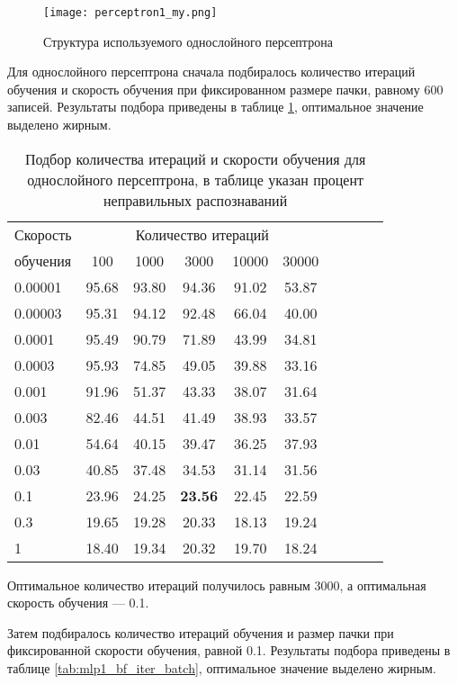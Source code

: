 \begin{figure}[h]
	\centering
	\texttt{[image: perceptron1\_my.png]}
	\caption{Структура используемого однослойного персептрона}
	\label{fig:perceptron1_my}
\end{figure}

Для однослойного персептрона сначала подбиралось количество итераций обучения и скорость обучения при фиксированном размере пачки, равному 600 записей.
Результаты подбора приведены в таблице \ref{tab:mlp1_bf_iter_pace}, оптимальное значение выделено жирным.

\begin{table}[h]
	\centering
	\caption{Подбор количества итераций и скорости обучения для однослойного персептрона, в таблице указан процент неправильных распознаваний}
	\label{tab:mlp1_bf_iter_pace}
	\begin{tabular}{| l | c | c | c | c | c | c | c | c | c |}
		\hline
		Скорость & \multicolumn{5}{c|}{Количество итераций} \\
		\hhline{~---------}
		обучения \phantom{00} & \phantom{000} 100 \phantom{000} & \phantom{000}1000\phantom{000} & \phantom{000}3000\phantom{000} & \phantom{00} 10000 \phantom{00} & \phantom{00} 30000 \phantom{00} \\
		\hline
		0.00001  & 95.68 & 93.80 & 94.36 & 91.02 & 53.87 \\
		0.00003  & 95.31 & 94.12 & 92.48 & 66.04 & 40.00 \\
		0.0001	 & 95.49 & 90.79 & 71.89 & 43.99 & 34.81 \\
		0.0003	 & 95.93 & 74.85 & 49.05 & 39.88 & 33.16 \\
		0.001  	 & 91.96 & 51.37 & 43.33 & 38.07 & 31.64 \\
		0.003 	 & 82.46 & 44.51 & 41.49 & 38.93 & 33.57 \\
		0.01 	 & 54.64 & 40.15 & 39.47 & 36.25 & 37.93 \\
		0.03 	 & 40.85 & 37.48 & 34.53 & 31.14 & 31.56 \\
		0.1 	 & 23.96 & 24.25 & \textbf{23.56} & 22.45 & 22.59 \\
		0.3 	 & 19.65 & 19.28 & 20.33 & 18.13 & 19.24 \\
		1 		 & 18.40 & 19.34 & 20.32 & 19.70 & 18.24 \\
		\hline
	\end{tabular}
\end{table}
Оптимальное количество итераций получилось равным 3000, а оптимальная скорость обучения --- 0.1.

Затем подбиралось количество итераций обучения и размер пачки при фиксированной скорости обучения, равной 0.1.
Результаты подбора приведены в таблице \ref{tab:mlp1_bf_iter_batch}, оптимальное значение выделено жирным.

